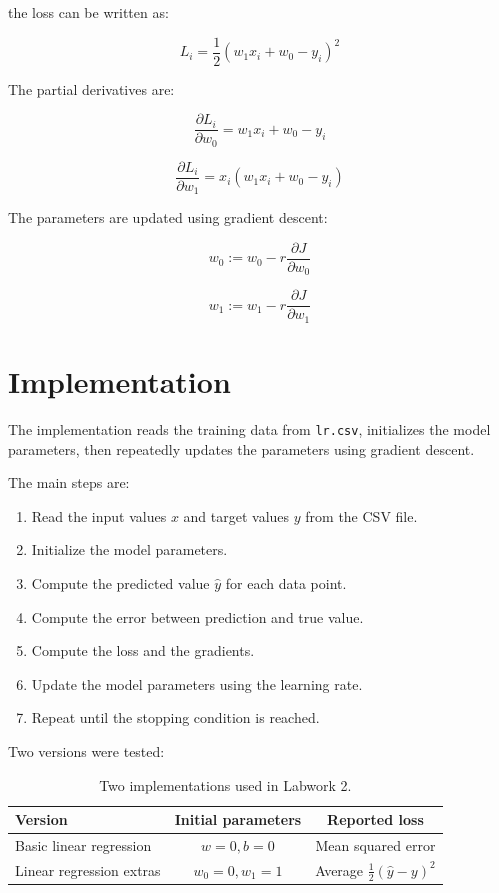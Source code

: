 \documentclass[12pt,a4paper]{article}
\begin{document}
the loss can be written as:

\[
L_i = \frac{1}{2}(w_1x_i + w_0 - y_i)^2
\]

The partial derivatives are:

\[
\frac{\partial L_i}{\partial w_0} = w_1x_i + w_0 - y_i
\]

\[
\frac{\partial L_i}{\partial w_1} = x_i(w_1x_i + w_0 - y_i)
\]

The parameters are updated using gradient descent:

\[
w_0 := w_0 - r\frac{\partial J}{\partial w_0}
\]

\[
w_1 := w_1 - r\frac{\partial J}{\partial w_1}
\]

\section{Implementation}

The implementation reads the training data from \texttt{lr.csv}, initializes the model parameters, then repeatedly updates the parameters using gradient descent.

The main steps are:

\begin{enumerate}
  \item Read the input values \(x\) and target values \(y\) from the CSV file.
  \item Initialize the model parameters.
  \item Compute the predicted value \(\hat{y}\) for each data point.
  \item Compute the error between prediction and true value.
  \item Compute the loss and the gradients.
  \item Update the model parameters using the learning rate.
  \item Repeat until the stopping condition is reached.
\end{enumerate}

Two versions were tested:

\begin{table}[H]
\centering
\begin{tabular}{lcc}
\toprule
Version & Initial parameters & Reported loss \\
\midrule
Basic linear regression & \(w=0, b=0\) & Mean squared error \\
Linear regression extras & \(w_0=0, w_1=1\) & Average \(\frac{1}{2}(\hat{y}-y)^2\) \\
\bottomrule
\end{tabular}
\caption{Two implementations used in Labwork 2.}
\end{table}
\end{document}
